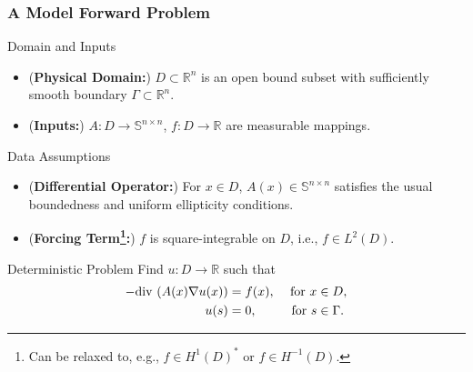 \documentclass[aspectratio=169,xcolor=dvipsnames,10pt]{beamer}
\begin{document}
\begin{frame}\frametitle{A Model Forward Problem}
\begin{block}{Domain and Inputs}
\begin{itemize}
\item (\textbf{Physical Domain:}) $D \subset \mathbb R^n$ is an open bound subset with sufficiently smooth boundary $\Gamma \subset \mathbb R^n$. 
\item  (\textbf{Inputs:}) $A: D \to \mathbb S^{n \times n}$, $f: D \to \mathbb R$ are measurable mappings.
\end{itemize}
\end{block}

\begin{block}{Data Assumptions}
\begin{itemize}
\item (\textbf{Differential Operator:}) For $x \in D$, $A(x) \in \mathbb S^{n\times n}$ satisfies the usual boundedness and uniform ellipticity conditions.
\item  (\textbf{Forcing Term\footnote{\scriptsize Can be relaxed to, e.g., $f \in H^1(D)^*$ or $f \in H^{-1}(D)$.}:}) $f$ is square-integrable on $D$, i.e., $f \in L^2(D)$.
\end{itemize}
\end{block}

\begin{block}{Deterministic Problem}
Find $u: D \to \mathbb R$ such that
\begin{equation}\label{eq:lin_ellip_deter}
\aligned
-\mathrm{div\,}\left(A(x) \nabla u(x) \right) 
&= f(x), &\text{ for } x  &\in D,\\
u(s)
&= 0,          &\text{ for } s &\in \Gamma.
\endaligned
\end{equation}
\end{block}
\end{frame}
\end{document}
